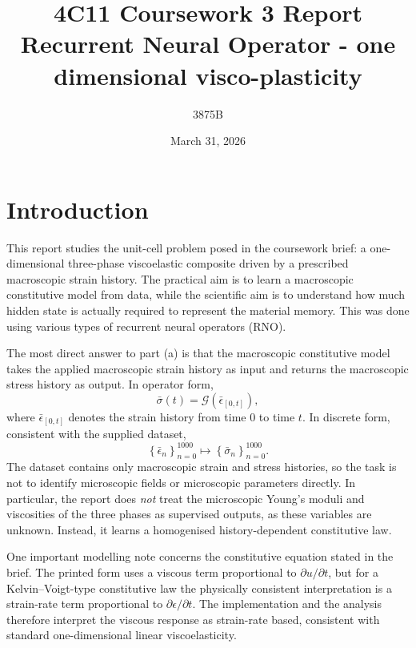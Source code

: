 \documentclass[11pt,a4paper, onecolumn]{article}
\title{\textbf{4C11 Coursework 3 Report} \\ Recurrent Neural Operator - one dimensional visco-plasticity}
\author{3875B}
\date{March 31, 2026}
\newcommand{\epsbar}{\bar{\epsilon}}
\newcommand{\sigbar}{\bar{\sigma}}
\begin{document}
\maketitle

\section{Introduction}

This report studies the unit-cell problem posed in the coursework brief: a one-dimensional three-phase viscoelastic composite driven by a prescribed macroscopic strain history. The practical aim is to learn a macroscopic constitutive model from data, while the scientific aim is to understand how much hidden state is actually required to represent the material memory. This was done using various types of recurrent neural operators (RNO).

The most direct answer to part (a) is that the macroscopic constitutive model takes the applied macroscopic strain history as input and returns the macroscopic stress history as output. In operator form,
\begin{equation}
\sigbar(t)=\mathcal{G}\!\left(\epsbar_{[0,t]}\right),
\label{eq:macro_operator}
\end{equation}
where $\epsbar_{[0,t]}$ denotes the strain history from time $0$ to time $t$. In discrete form, consistent with the supplied dataset,
\begin{equation}
\left\{\epsbar_n\right\}_{n=0}^{1000}\mapsto \left\{\sigbar_n\right\}_{n=0}^{1000}.
\label{eq:discrete_operator}
\end{equation}
The dataset contains only macroscopic strain and stress histories, so the task is not to identify microscopic fields or microscopic parameters directly. In particular, the report does \emph{not} treat the microscopic Young's moduli and viscosities of the three phases as supervised outputs, as these variables are unknown. Instead, it learns a homogenised history-dependent constitutive law.

One important modelling note concerns the constitutive equation stated in the brief. The printed form uses a viscous term proportional to $\partial u/\partial t$, but for a Kelvin--Voigt-type constitutive law the physically consistent interpretation is a strain-rate term proportional to $\partial \epsilon/\partial t$. The implementation and the analysis therefore interpret the viscous response as strain-rate based, consistent with standard one-dimensional linear viscoelasticity.
\end{document}
